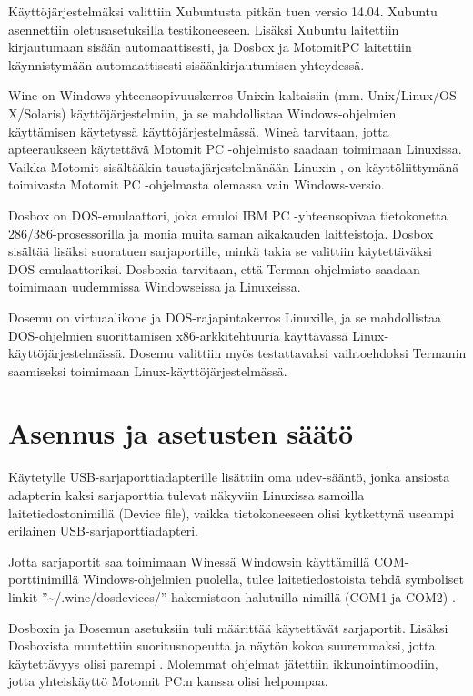 Käyttöjärjestelmäksi valittiin Xubuntusta pitkän tuen versio 14.04. Xubuntu asennettiin oletusasetuksilla testikoneeseen. Lisäksi Xubuntu laitettiin kirjautumaan sisään automaattisesti, ja Dosbox ja MotomitPC laitettiin käynnistymään automaattisesti sisäänkirjautumisen yhteydessä.

Wine on Windows-yhteensopivuuskerros Unixin kaltaisiin (mm. Unix/Linux/OS X/Solaris) käyttöjärjestelmiin, ja se mahdollistaa Windows-ohjelmien käyttämisen käytetyssä käyttöjärjestelmässä. Wineä tarvitaan, jotta apteeraukseen käytettävä Motomit PC -ohjelmisto saadaan toimimaan Linuxissa. Vaikka Motomit sisältääkin taustajärjestelmänään Linuxin \cite{motomit:manual}, on käyttöliittymänä toimivasta Motomit PC -ohjelmasta olemassa vain Windows-versio.

Dosbox on DOS-emulaattori, joka emuloi IBM PC -yhteensopivaa tietokonetta 286/386-prosessorilla ja monia muita saman aikakauden laitteistoja. Dosbox sisältää lisäksi suoratuen sarjaportille, minkä takia se valittiin käytettäväksi DOS-emulaattoriksi. Dosboxia tarvitaan, että Terman-ohjelmisto saadaan toimimaan uudemmissa Windowseissa ja Linuxeissa.

Dosemu on virtuaalikone ja DOS-rajapintakerros Linuxille, ja se mahdollistaa DOS-ohjelmien suorittamisen x86-arkkitehtuuria käyttävässä Linux-käyttöjärjestelmässä. Dosemu valittiin myös testattavaksi vaihtoehdoksi Termanin saamiseksi toimimaan Linux-käyttöjärjestelmässä.

\section{Asennus ja asetusten säätö}
Käytetylle USB-sarjaporttiadapterille lisättiin oma udev-sääntö, jonka ansiosta adapterin kaksi sarjaporttia tulevat näkyviin Linuxissa samoilla laitetiedostonimillä (Device file), vaikka tietokoneeseen olisi kytkettynä useampi erilainen USB-sarjaporttiadapteri.

Jotta sarjaportit saa toimimaan Winessä Windowsin käyttämillä COM-porttinimillä Windows-ohjelmien puolella, tulee laitetiedostoista tehdä symboliset linkit ''\textasciitilde{}/.wine/dosdevices/''-hakemistoon halutuilla nimillä (COM1 ja COM2) \cite[s. 21]{wine:manual}.

Dosboxin ja Dosemun asetuksiin tuli määrittää käytettävät sarjaportit. Lisäksi Dosboxista muutettiin suoritusnopeutta ja näytön kokoa suuremmaksi, jotta käytettävyys olisi parempi \cite{dosbox:conf}. Molemmat ohjelmat jätettiin ikkunointimoodiin, jotta yhteiskäyttö Motomit PC:n kanssa olisi helpompaa.

